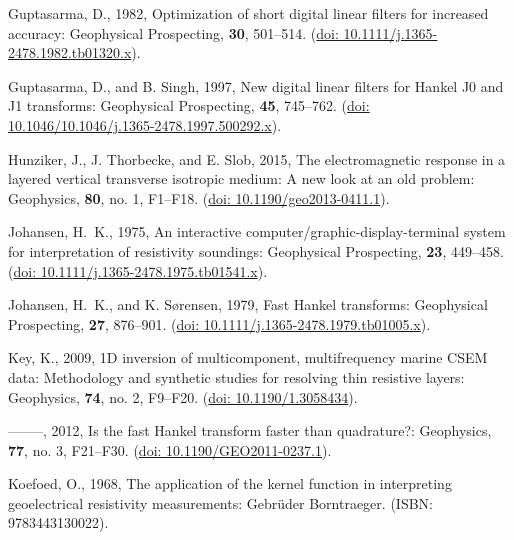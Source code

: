 \documentclass[paper,twocolumn,twoside]{geophysics}
\begin{document}
\begin{thebibliography}{}
Guptasarma, D.,  1982, Optimization of short digital linear filters for
  increased accuracy: Geophysical Prospecting, {\bf 30}, 501--514.
\newblock (\href{http://doi.org/10.1111/j.1365-2478.1982.tb01320.x}{doi:
  10.1111/j.1365-2478.1982.tb01320.x}).

Guptasarma, D., and B. Singh,  1997, New digital linear filters for {H}ankel
  {J}0 and {J}1 transforms: Geophysical Prospecting, {\bf 45}, 745--762.
\newblock (\href{http://doi.org/10.1046/j.1365-2478.1997.500292.x}{doi:
  10.1046/10.1046/j.1365-2478.1997.500292.x}).

Hunziker, J., J. Thorbecke, and E. Slob,  2015, The electromagnetic response in
  a layered vertical transverse isotropic medium: {A} new look at an old
  problem: Geophysics, {\bf 80}, no. 1, F1--F18.
\newblock (\href{http://doi.org/10.1190/geo2013-0411.1}{doi:
  10.1190/geo2013-0411.1}).

Johansen, H.~K.,  1975, An interactive computer/graphic-display-terminal system
  for interpretation of resistivity soundings: Geophysical Prospecting, {\bf
  23}, 449--458.
\newblock (\href{http://doi.org/10.1111/j.1365-2478.1975.tb01541.x}{doi:
  10.1111/j.1365-2478.1975.tb01541.x}).

Johansen, H.~K., and K. Sørensen,  1979, Fast {H}ankel transforms: Geophysical
  Prospecting, {\bf 27}, 876--901.
\newblock (\href{http://doi.org/10.1111/j.1365-2478.1979.tb01005.x}{doi:
  10.1111/j.1365-2478.1979.tb01005.x}).

Key, K.,  2009, {1D} inversion of multicomponent, multifrequency marine {CSEM}
  data: {M}ethodology and synthetic studies for resolving thin resistive
  layers: Geophysics, {\bf 74}, no. 2, F9--F20.
\newblock (\href{http://doi.org/10.1190/1.3058434}{doi: 10.1190/1.3058434}).

--------, 2012, Is the fast {H}ankel transform faster than quadrature?:
  Geophysics, {\bf 77}, no. 3, F21--F30.
\newblock (\href{http://doi.org/10.1190/GEO2011-0237.1}{doi:
  10.1190/GEO2011-0237.1}).

Koefoed, O.,  1968, The application of the kernel function in interpreting
  geoelectrical resistivity measurements: Gebrüder Borntraeger.
\newblock ({I}SBN: 9783443130022).


\end{thebibliography}
\end{document}
